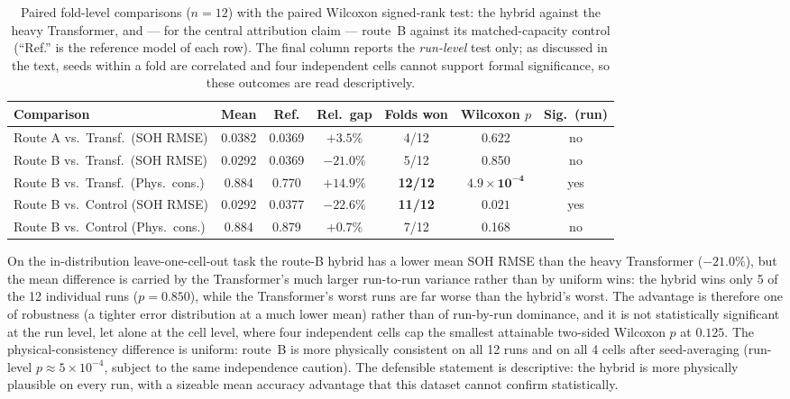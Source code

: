 \begin{table}[H]
\centering
\caption{Paired fold-level comparisons ($n=12$) with the paired Wilcoxon
signed-rank test: the hybrid against the heavy Transformer, and --- for the
central attribution claim --- route~B against its matched-capacity control
(``Ref.'' is the reference model of each row). The final column
reports the \emph{run-level} test only; as discussed in the text, seeds within a
fold are correlated and four independent cells cannot support formal
significance, so these outcomes are read descriptively.}
\label{tab:gap}
\footnotesize %
\setlength{\tabcolsep}{3.5pt}
\begin{tabular}{l c c c c c c}
\toprule
\textbf{Comparison} & \textbf{Mean} & \textbf{Ref.} & \textbf{Rel.\ gap} & \textbf{Folds won} & \textbf{Wilcoxon $p$} & \textbf{Sig.\ (run)} \\
\midrule
Route A vs.\ Transf.\ (SOH RMSE) & 0.0382 & 0.0369 & $+3.5\%$ & 4/12 & 0.622 & no \\
Route B vs.\ Transf.\ (SOH RMSE) & 0.0292 & 0.0369 & $\mathbf{-21.0\%}$ & 5/12 & 0.850 & no \\
Route B vs.\ Transf.\ (Phys.\ cons.) & 0.884 & 0.770 & $+14.9\%$ & \textbf{12/12} & $\mathbf{4.9\!\times\!10^{-4}}$ & yes \\
\midrule
Route B vs.\ Control (SOH RMSE) & 0.0292 & 0.0377 & $\mathbf{-22.6\%}$ & \textbf{11/12} & $\mathbf{0.021}$ & yes \\
Route B vs.\ Control (Phys.\ cons.) & 0.884 & 0.879 & $+0.7\%$ & 7/12 & 0.168 & no \\
\bottomrule
\end{tabular}
\end{table}

On the in-distribution leave-one-cell-out task the route-B hybrid has a lower
mean SOH RMSE than the heavy Transformer ($-21.0\%$), but the mean difference
is carried by the Transformer's much larger run-to-run variance rather than by
uniform wins: the hybrid wins only 5 of the 12 individual runs ($p=0.850$),
while the Transformer's worst runs are far worse than the hybrid's worst. The
advantage is therefore one of robustness (a tighter error distribution at a
much lower mean) rather than of run-by-run dominance, and it is not
statistically significant at the run level, let alone at the cell level, where
four independent cells cap the smallest attainable two-sided Wilcoxon $p$ at
$0.125$. The physical-consistency
difference is uniform: route~B is more physically consistent on all 12 runs and
on all 4 cells after seed-averaging (run-level $p\approx5\times10^{-4}$, subject
to the same independence caution). The defensible statement is descriptive: the
hybrid is more physically plausible on every run, with a sizeable mean accuracy
advantage that this dataset cannot confirm statistically.

